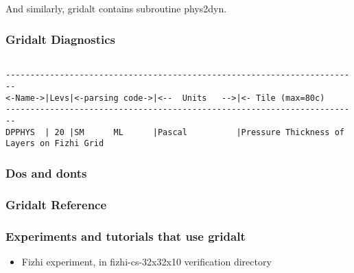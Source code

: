 \noindent And similarly, gridalt contains subroutine phys2dyn.

\subsubsection {Gridalt Diagnostics}
\label{sec:pkg:gridalt:diagnostics}

{\footnotesize
\begin{verbatim}

------------------------------------------------------------------------
<-Name->|Levs|<-parsing code->|<--  Units   -->|<- Tile (max=80c) 
------------------------------------------------------------------------
DPPHYS  | 20 |SM      ML      |Pascal          |Pressure Thickness of Layers on Fizhi Grid
\end{verbatim}
}

\subsubsection {Dos and donts}

\subsubsection {Gridalt Reference} 

\subsubsection{Experiments and tutorials that use gridalt}
\label{sec:pkg:gridalt:experiments}

\begin{itemize}
\item{Fizhi experiment, in fizhi-cs-32x32x10 verification directory }
\end{itemize}
